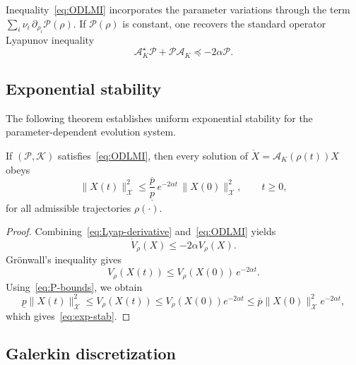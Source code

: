 \documentclass[AMA,Times2COL]{WileyNJDv5}
\newcommand{\preceqop}{\mathrel{\preccurlyeq}}
\begin{document}
\begin{remark}
Inequality~\eqref{eq:ODLMI} incorporates the parameter variations through the term $\sum_i\nu_i\,\partial_{\rho_i}\mathcal{P}(\rho)$.
If $\mathcal{P}(\rho)$ is constant, one recovers the standard operator Lyapunov inequality
\[
\mathcal{A}_K^{\star}\mathcal{P}
+
\mathcal{P}\mathcal{A}_K
\preceqop
-2\alpha \mathcal{P}.
\]
\end{remark}

\subsection{Exponential stability}

The following theorem establishes uniform exponential stability for the parameter-dependent evolution system.

\begin{theorem}
\label{thm:exp-stab}
If $(\mathcal{P},\mathcal{K})$ satisfies~\eqref{eq:ODLMI}, then every solution of $\dot X=\mathcal{A}_K(\rho(t))X$ obeys
\begin{equation}\label{eq:exp-stab}
\|X(t)\|_{\mathscr{X}}^{2}
\le
\frac{\overline{p}}{\underline{p}}\,
e^{-2\alpha t}\,
\|X(0)\|_{\mathscr{X}}^{2},
\qquad t\ge 0,
\end{equation}
for all admissible trajectories $\rho(\cdot)$.
\end{theorem}

\begin{proof}
Combining~\eqref{eq:Lyap-derivative} and~\eqref{eq:ODLMI} yields
\[
\dot V_\rho(X)\le -2\alpha V_\rho(X).
\]
Grönwall's inequality gives
\[
V_\rho(X(t))
\le
V_\rho(X(0))\,e^{-2\alpha t}.
\]
Using~\eqref{eq:P-bounds}, we obtain
\[
\underline p\|X(t)\|_{\mathscr X}^2
\le
V_\rho(X(t))
\le
V_\rho(X(0))e^{-2\alpha t}
\le
\overline p\|X(0)\|_{\mathscr X}^2 e^{-2\alpha t},
\]
which gives~\eqref{eq:exp-stab}.
\end{proof}

\subsection{Galerkin discretization}\label{sec:Galerkin-setting}
\end{document}
